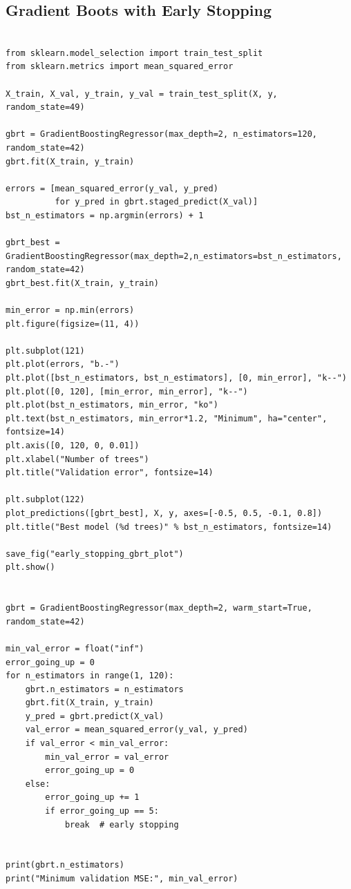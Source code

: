 \documentclass[%
oneside,                 %
final,                   %
10pt]{article}
\begin{document}
\subsection*{Gradient Boots with Early Stopping}
\begin{verbatim}

from sklearn.model_selection import train_test_split
from sklearn.metrics import mean_squared_error

X_train, X_val, y_train, y_val = train_test_split(X, y, random_state=49)

gbrt = GradientBoostingRegressor(max_depth=2, n_estimators=120, random_state=42)
gbrt.fit(X_train, y_train)

errors = [mean_squared_error(y_val, y_pred)
          for y_pred in gbrt.staged_predict(X_val)]
bst_n_estimators = np.argmin(errors) + 1

gbrt_best = GradientBoostingRegressor(max_depth=2,n_estimators=bst_n_estimators, random_state=42)
gbrt_best.fit(X_train, y_train)

min_error = np.min(errors)
plt.figure(figsize=(11, 4))

plt.subplot(121)
plt.plot(errors, "b.-")
plt.plot([bst_n_estimators, bst_n_estimators], [0, min_error], "k--")
plt.plot([0, 120], [min_error, min_error], "k--")
plt.plot(bst_n_estimators, min_error, "ko")
plt.text(bst_n_estimators, min_error*1.2, "Minimum", ha="center", fontsize=14)
plt.axis([0, 120, 0, 0.01])
plt.xlabel("Number of trees")
plt.title("Validation error", fontsize=14)

plt.subplot(122)
plot_predictions([gbrt_best], X, y, axes=[-0.5, 0.5, -0.1, 0.8])
plt.title("Best model (%d trees)" % bst_n_estimators, fontsize=14)

save_fig("early_stopping_gbrt_plot")
plt.show()


gbrt = GradientBoostingRegressor(max_depth=2, warm_start=True, random_state=42)

min_val_error = float("inf")
error_going_up = 0
for n_estimators in range(1, 120):
    gbrt.n_estimators = n_estimators
    gbrt.fit(X_train, y_train)
    y_pred = gbrt.predict(X_val)
    val_error = mean_squared_error(y_val, y_pred)
    if val_error < min_val_error:
        min_val_error = val_error
        error_going_up = 0
    else:
        error_going_up += 1
        if error_going_up == 5:
            break  # early stopping


print(gbrt.n_estimators)
print("Minimum validation MSE:", min_val_error)
\end{verbatim}
\end{document}
